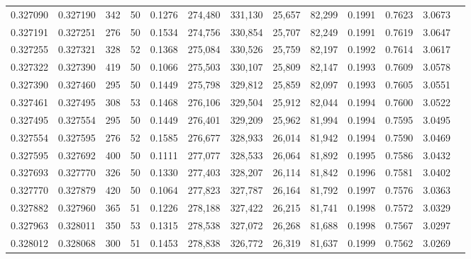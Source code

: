 \begin{tabular}{rrrrrrrrrrrrr}
0.327090 & 0.327190 &   342 &  50 &                                     0.1276 & 274,480 & 331,130 &  25,657 &  82,299 & 0.1991 & 0.7623 & 3.0673 \\
0.327191 & 0.327251 &   276 &  50 &                                     0.1534 & 274,756 & 330,854 &  25,707 &  82,249 & 0.1991 & 0.7619 & 3.0647 \\
0.327255 & 0.327321 &   328 &  52 &                                     0.1368 & 275,084 & 330,526 &  25,759 &  82,197 & 0.1992 & 0.7614 & 3.0617 \\
0.327322 & 0.327390 &   419 &  50 &                                     0.1066 & 275,503 & 330,107 &  25,809 &  82,147 & 0.1993 & 0.7609 & 3.0578 \\
0.327390 & 0.327460 &   295 &  50 &                                     0.1449 & 275,798 & 329,812 &  25,859 &  82,097 & 0.1993 & 0.7605 & 3.0551 \\
0.327461 & 0.327495 &   308 &  53 &                                     0.1468 & 276,106 & 329,504 &  25,912 &  82,044 & 0.1994 & 0.7600 & 3.0522 \\
0.327495 & 0.327554 &   295 &  50 &                                     0.1449 & 276,401 & 329,209 &  25,962 &  81,994 & 0.1994 & 0.7595 & 3.0495 \\
0.327554 & 0.327595 &   276 &  52 &                                     0.1585 & 276,677 & 328,933 &  26,014 &  81,942 & 0.1994 & 0.7590 & 3.0469 \\
0.327595 & 0.327692 &   400 &  50 &                                     0.1111 & 277,077 & 328,533 &  26,064 &  81,892 & 0.1995 & 0.7586 & 3.0432 \\
0.327693 & 0.327770 &   326 &  50 &                                     0.1330 & 277,403 & 328,207 &  26,114 &  81,842 & 0.1996 & 0.7581 & 3.0402 \\
0.327770 & 0.327879 &   420 &  50 &                                     0.1064 & 277,823 & 327,787 &  26,164 &  81,792 & 0.1997 & 0.7576 & 3.0363 \\
0.327882 & 0.327960 &   365 &  51 &                                     0.1226 & 278,188 & 327,422 &  26,215 &  81,741 & 0.1998 & 0.7572 & 3.0329 \\
0.327963 & 0.328011 &   350 &  53 &                                     0.1315 & 278,538 & 327,072 &  26,268 &  81,688 & 0.1998 & 0.7567 & 3.0297 \\
0.328012 & 0.328068 &   300 &  51 &                                     0.1453 & 278,838 & 326,772 &  26,319 &  81,637 & 0.1999 & 0.7562 & 3.0269 \\

\end{tabular}

